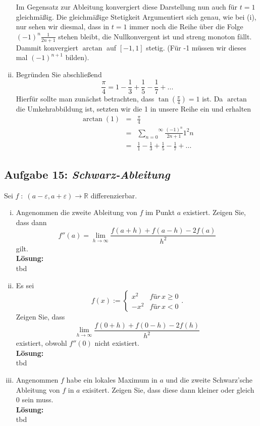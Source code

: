 \documentclass[11pt,a4paper,ngerman]{article}
\begin{document}
\begin{enumerate}[(i)]
        Im Gegensatz zur Ableitung konvergiert diese Darstellung nun auch für $t=1$ gleichmäßig.
        Die gleichmäßige Stetigkeit Argumentiert sich genau, wie bei (i), nur sehen wir diesmal,
        dass in $t=1$ immer noch die Reihe über die Folge $(-1)^n \frac{1}{2n+1}$ stehen bleibt,
        die Nullkonvergent ist und streng monoton fällt. Dammit konvergiert $\arctan$ auf $[-1,1]$ stetig.
        (Für -1 müssen wir dieses mal $(-1)^{n+1}$ bilden).

    \item Begründen Sie abschließend
        $$
            \frac{\pi}{4} = 1 - \frac{1}{3} + \frac{1}{5} - \frac{1}{7} + ...
        $$
        Hierfür sollte man zunächst betrachten, dass $\tan(\frac{\pi}{4}) = 1$ ist. Da $\arctan$ die
        Umkehrabbildung ist, setzten wir die 1 in unsere Reihe ein und erhalten
        $$\begin{array}{rcl}
            \arctan (1) &=& \frac{\pi}{4} \\
                &=& \overset{\infty}{\underset{n=0}{\sum}} \frac{(-1)^n}{2n+1}1^2n\\
                &=& \frac{1}{1} - \frac{1}{3} + \frac{1}{5} - \frac{1}{7} + ...
        \end{array}$$
\end{enumerate}

\subsection*{Aufgabe 15: \mdseries\itshape Schwarz-Ableitung}
Sei $f \; : \; (a - \varepsilon, a +\varepsilon) \longrightarrow \mathbb{R}$ differenzierbar.

\begin{enumerate}[(i)]
    \item Angenommen die zweite Ableitung von $f$ im Punkt $a$ existiert. Zeigen Sie, dass dann
        $$
            f''(a) = \underset{h \rightarrow \infty}{\lim} \frac{f(a+h) + f(a-h) - 2 f(a)}{h^2}
        $$
        gilt.\\
    \textbf{Lösung:}\\
        tbd

    \item Es sei
        $$
            f(x) := \left\{ \begin{array}{lr} x^2 & für \, x\geq 0 \\ -x^2 & für \, x<0\end{array}\right. .
        $$
        Zeigen Sie, dass
        $$
            \underset{h \rightarrow \infty}{\lim} \frac{f(0+h) + f(0-h) - 2f(h)}{h^2}
        $$
        existiert, obwohl $f''(0)$ nicht existiert.\\
    \textbf{Lösung:}\\
        tbd

    \item Angenommen $f$ habe ein lokales Maximum in $a$ und die zweite Schwarz'sche Ableitung von $f$
        in $a$ exisitert. Zeigen Sie, dass diese dann kleiner oder gleich 0 sein muss.\\
    \textbf{Lösung:}\\
        tbd
\end{enumerate}

\label{LastPage}
\end{document}
